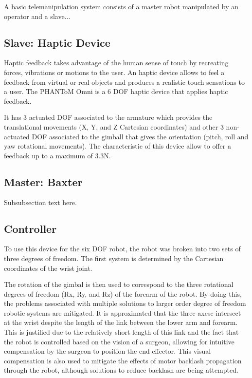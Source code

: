 \documentclass[journal,twoside]{JoPhA}
\begin{document}
  A basic telemanipulation system consists of a master robot manipulated by an operator and a slave...
  

\subsection{Slave: Haptic Device}
Haptic feedback takes advantage of the human sense of touch by recreating forces, vibrations or motions to the user. 
An haptic device allows to feel a feedback from virtual or real objects and produces a realistic touch sensations to a user. 
The PHANToM Omni is a 6 DOF haptic device that applies haptic feedback. 

 

It has 3 actuated DOF associated to the armature which provides the translational movements (X, Y, and Z Cartesian coordinates) and other 3 non-actuated DOF associated to the gimball  that gives the orientation (pitch, roll and yaw rotational movements).  The characteristic of this device allow to offer a feedback up to a maximum of 3.3N.


\subsection{Master: Baxter}
Subsubsection text here.

\subsection{Controller}
{\color{red}{Hay que adaptar a nuestro sistema}}

To use this device for the six DOF robot, the robot was broken into two 
sets of three degrees of freedom.  The first system is determined by 
the Cartesian coordinates of the wrist joint.  

The  rotation  of  the  gimbal  is  then  used  to  correspond  to  the  three rotational  degrees  of  freedom  (Rx,  Ry,  and  Rz)  of  the  forearm  of  the  robot.    
By  doing  this,  the  problems  associated  with  multiple  solutions  to  larger  order  degree  of  freedom  robotic  systems  are  mitigated.    
It  is  approximated  that  the  three  axese intersect  at  the  wrist despite the length of the link between the lower arm and forearm.  
This is justified due to the relatively short length of this link and the fact that the robot is controlled based on the vision of a surgeon, allowing for intuitive compensation by the surgeon to position the  end  effector.
This  visual  compensation  is  also  used  to  mitigate  the  effects  of  motor backlash propagation through the robot, although solutions to reduce backlash are being attempted.
\end{document}
